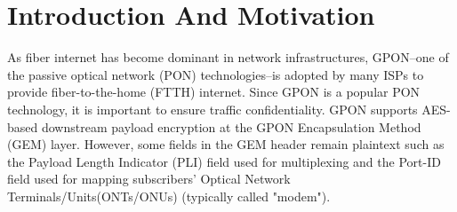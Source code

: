 \documentclass[conference]{IEEEtran}
\begin{document}
\maketitle

\begin{abstract}
Gigabit Passive Optical Networks (GPON), an ITU-T standardized technology adopted in FTTH networks, supports downstream payload encryption to protect subscribers' traffic. Unfortunately, encryption does not cover all access layer metadata. This poster presents a preliminary analysis demonstrating that the Payload Length Indicator (PLI), which remains in plaintext in GEM headers, can be exploited as a side channel to infer streaming activity. Using a GPON downstream simulator, We demonstrate that PLI traces are highly consistent across repeated runs of the same Youtube video and suggest that a passive attacker on the same optical splitter as the victim could potentially infer a victim's streaming activity (e.g., Youtube Video Identification). 
\end{abstract}






%
\IEEEpeerreviewmaketitle



\section{Introduction And Motivation}
As fiber internet has become dominant in network infrastructures, GPON--one of the passive optical network (PON) technologies--is adopted by many ISPs to provide fiber-to-the-home (FTTH) internet. Since GPON is a popular PON technology, it is important to ensure traffic confidentiality. 
 GPON supports AES-based downstream payload encryption at the GPON Encapsulation Method (GEM) layer. However, some fields in the GEM header remain plaintext such as the Payload Length Indicator (PLI) field used for multiplexing and the Port-ID field used for mapping subscribers' Optical Network Terminals/Units(ONTs/ONUs) (typically called "modem").
\end{document}
